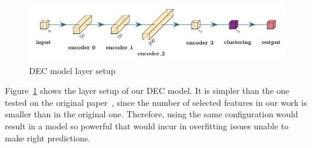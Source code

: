 \documentclass[11pt,a4paper,english,twocolumn]{article}
\begin{document}
\begin{figure}[!hbt]
  \centering
  \includegraphics[scale=0.8]{../figures/dec_diagram.pdf}
  \caption{DEC model layer setup}
  \label{fig:dec_model_setup}
\end{figure}

Figure~\ref{fig:dec_model_setup} shows the layer setup of our DEC model.
It is simpler than the one tested on the original paper~\cite{xie2016unsupervised},
since the number of selected features in our work is smaller than in the original one.
Therefore, using the same configuration would result in a model so
powerful that would incur in overfitting issues unable to make right predictions.
\end{document}
